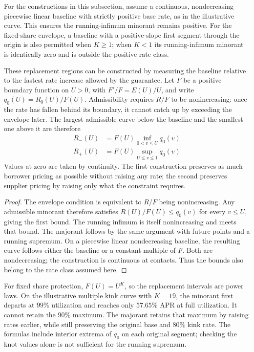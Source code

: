 \documentclass[11pt,a4paper]{article}
\begin{document}
For the constructions in this subsection, assume a continuous, nondecreasing piecewise linear baseline with strictly positive base rate, as in the illustrative curve. This ensures the running-infimum minorant remains positive. For the fixed-share envelope, a baseline with a positive-slope first segment through the origin is also permitted when $K\geq1$; when $K<1$ its running-infimum minorant is identically zero and is outside the positive-rate class.

These replacement regions can be constructed by measuring the baseline relative to the fastest rate increase allowed by the guarantee. Let $F$ be a positive boundary function on $U>0$, with $F'/F=E(U)/U$, and write $q_0(U)=R_0(U)/F(U)$. Admissibility requires $R/F$ to be nonincreasing: once the rate has fallen behind its boundary, it cannot catch up by exceeding the envelope later. The largest admissible curve below the baseline and the smallest one above it are therefore
\[
\boxed{
\begin{aligned}
R_-(U)&=F(U)\inf_{0<v\leq U}q_0(v)\\
R_+(U)&=F(U)\sup_{U\leq v\leq1}q_0(v)
\end{aligned}
}
\]
Values at zero are taken by continuity. The first construction preserves as much borrower pricing as possible without raising any rate; the second preserves supplier pricing by raising only what the constraint requires.

\begin{proof}
The envelope condition is equivalent to $R/F$ being nonincreasing. Any admissible minorant therefore satisfies $R(U)/F(U)\leq q_0(v)$ for every $v\leq U$, giving the first bound. The running infimum is itself nonincreasing and meets that bound. The majorant follows by the same argument with future points and a running supremum. On a piecewise linear nondecreasing baseline, the resulting curve follows either the baseline or a constant multiple of $F$. Both are nondecreasing; the construction is continuous at contacts. Thus the bounds also belong to the rate class assumed here.
\end{proof}

For fixed share protection, $F(U)=U^K$, so the replacement intervals are power laws. On the illustrative multiple kink curve with $K=19$, the minorant first departs at $99\%$ utilization and reaches only $57.65\%$ APR at full utilization. It cannot retain the $90\%$ maximum. The majorant retains that maximum by raising rates earlier, while still preserving the original base and $80\%$ kink rate. The formulas include interior extrema of $q_0$ on each original segment; checking the knot values alone is not sufficient for the running supremum.
\end{document}
